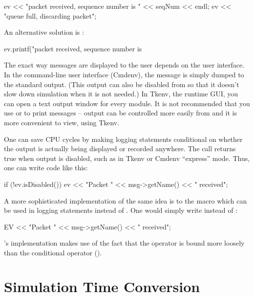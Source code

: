 \begin{cpp}
ev << "packet received, sequence number is " << seqNum << endl;
ev << "queue full, discarding packet\n";
\end{cpp}

An alternative solution is :

\begin{cpp}
ev.printf("packet received, sequence number is %
\end{cpp}

The exact way messages are displayed to the user depends on the user
interface. In the command-line user interface (Cmdenv),
the message is simply dumped to the standard output. (This output can also be
disabled from  so that it doesn't slow down simulation
when it is not needed.) In Tkenv, the runtime GUI, you can open
a text output window for every module.
It is not recommended that you use  or 
to print messages --  output can be controlled more easily
from  and it is more convenient to view, using Tkenv.

One can save CPU cycles by making logging statements conditional
on whether the output is actually being displayed or recorded anywhere.
The  call returns true when  output is disabled,
such as in Tkenv or Cmdenv ``express'' mode. Thus, one can write code like
this:

\begin{cpp}
if (!ev.isDisabled())
    ev << "Packet " << msg->getName() << " received\n";
\end{cpp}

A more sophisticated implementation of the same idea is to the 
macro which can be used in logging statements instead of .
One would simply write  instead of :

\begin{cpp}
EV << "Packet " << msg->getName() << " received\n";
\end{cpp}

's implementation makes use of the fact that the \ttt{<<} operator
is bound more loosely than the conditional operator ().



\section{Simulation Time Conversion}

